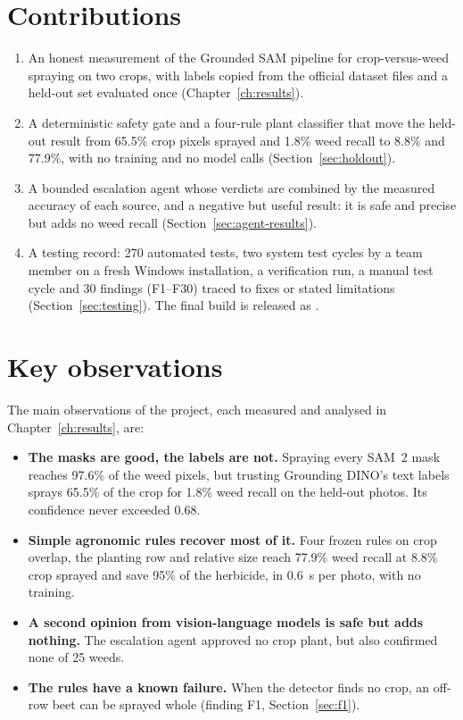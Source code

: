 \section{Contributions}\label{sec:contributions}
\begin{enumerate}
\item An honest measurement of the Grounded SAM pipeline for crop-versus-weed spraying on two crops,
  with labels copied from the official dataset files and a held-out set evaluated once
  (Chapter~\ref{ch:results}).
\item A deterministic safety gate and a four-rule plant classifier that move the held-out result from
  65.5\% crop pixels sprayed and 1.8\% weed recall to 8.8\% and 77.9\%, with no training and no model
  calls (Section~\ref{sec:holdout}).
\item A bounded escalation agent whose verdicts are combined by the measured accuracy of each source,
  and a negative but useful result: it is safe and precise but adds no weed recall
  (Section~\ref{sec:agent-results}).
\item A testing record: 270 automated tests, two system test cycles by a team member on a fresh
  Windows installation, a verification run, a manual test cycle and 30 findings (F1--F30) traced to
  fixes or stated limitations (Section~\ref{sec:testing}). The final build is released as
  .
\end{enumerate}

\section{Key observations}\label{sec:observations}
The main observations of the project, each measured and analysed in Chapter~\ref{ch:results}, are:
\begin{itemize}
\item \textbf{The masks are good, the labels are not.} Spraying every SAM~2 mask reaches 97.6\% of
  the weed pixels, but trusting Grounding DINO's text labels sprays 65.5\% of the crop for 1.8\% weed
  recall on the held-out photos. Its confidence never exceeded 0.68.
\item \textbf{Simple agronomic rules recover most of it.} Four frozen rules on crop overlap, the
  planting row and relative size reach 77.9\% weed recall at 8.8\% crop sprayed and save 95\% of the
  herbicide, in 0.6~s per photo, with no training.
\item \textbf{A second opinion from vision-language models is safe but adds nothing.} The escalation
  agent approved no crop plant, but also confirmed none of 25 weeds.
\item \textbf{The rules have a known failure.} When the detector finds no crop, an off-row beet can
  be sprayed whole (finding F1, Section~\ref{sec:f1}).
\end{itemize}


